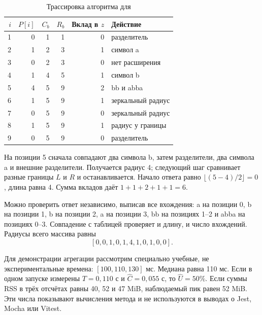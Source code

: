 \begin{table}[H]\centering
\caption{Трассировка алгоритма для }
\begin{tabular}{rrrrrl}
\toprule
$i$ & $P[i]$ & $C_b$ & $R_b$ & Вклад в $z$ & Действие\\\midrule
1 & 0 & 1 & 1 & 0 & разделитель\\
2 & 1 & 2 & 3 & 1 & символ a\\
3 & 0 & 2 & 3 & 0 & нет расширения\\
4 & 1 & 4 & 5 & 1 & символ b\\
5 & 4 & 5 & 9 & 2 & bb и abba\\
6 & 1 & 5 & 9 & 1 & зеркальный радиус\\
7 & 0 & 5 & 9 & 0 & зеркальный радиус\\
8 & 1 & 5 & 9 & 1 & радиус у границы\\
9 & 0 & 5 & 9 & 0 & разделитель\\\bottomrule
\end{tabular}
\end{table}

На позиции 5 сначала совпадают два символа b, затем разделители, два символа a и внешние разделители. Получается радиус 4; следующий шаг сравнивает разные границы $L$ и $R$ и останавливается. Начало ответа равно $\lfloor(5-4)/2\rfloor=0$, длина равна 4. Сумма вкладов даёт $1+1+2+1+1=6$.

Можно проверить ответ независимо, выписав все вхождения: a на позиции 0, b на позиции 1, b на позиции 2, a на позиции 3, bb на позициях 1--2 и abba на позициях 0--3. Совпадение с таблицей проверяет и длину, и число вхождений. Радиусы всего массива равны
\[
 [0,0,1,0,1,4,1,0,1,0,0].
\]

Для демонстрации агрегации рассмотрим специально учебные, не экспериментальные времена: $[100,110,130]$ мс. Медиана равна 110 мс. Если в одном запуске измерены $T=0{,}110$ с и $\widehat C=0{,}055$ с, то $\widehat U=50\%$. Если суммы RSS в трёх отсчётах равны 40, 52 и 47 MiB, наблюдаемый пик равен 52 MiB. Эти числа показывают вычисления метода и не используются в выводах о Jest, Mocha или Vitest.


